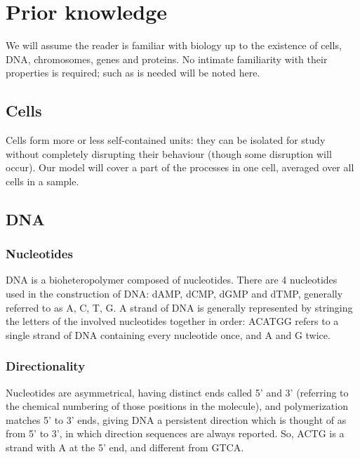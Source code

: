 \documentclass[fleqn]{book}
\begin{document}
\section{Prior knowledge}\label{prior-knowledge}

We will assume the reader is familiar with biology up to the existence
of cells, DNA, chromosomes, genes and proteins. No intimate familiarity
with their properties is required; such as is needed will be noted here.

\subsection{Cells}\label{cells}

Cells form more or less self-contained units: they can be isolated for
study without completely disrupting their behaviour (though some
disruption will occur). Our model will cover a part of the processes in
one cell, averaged over all cells in a sample.

\subsection{DNA}\label{dna}

\subsubsection{Nucleotides}\label{nucleotides}

DNA is a bioheteropolymer composed of nucleotides. There are 4
nucleotides used in the construction of DNA: dAMP, dCMP, dGMP and dTMP,
generally referred to as A, C, T, G. A strand of DNA is generally
represented by stringing the letters of the involved nucleotides
together in order: ACATGG refers to a single strand of DNA containing
every nucleotide once, and A and G twice.

\subsubsection{Directionality}\label{directionality}

Nucleotides are asymmetrical, having distinct ends called 5' and 3'
(referring to the chemical numbering of those positions in the
molecule), and polymerization matches 5' to 3' ends, giving DNA a
persistent direction which is thought of as from 5' to 3', in which
direction sequences are always reported. So, ACTG is a strand with A at
the 5' end, and different from GTCA.
\end{document}

